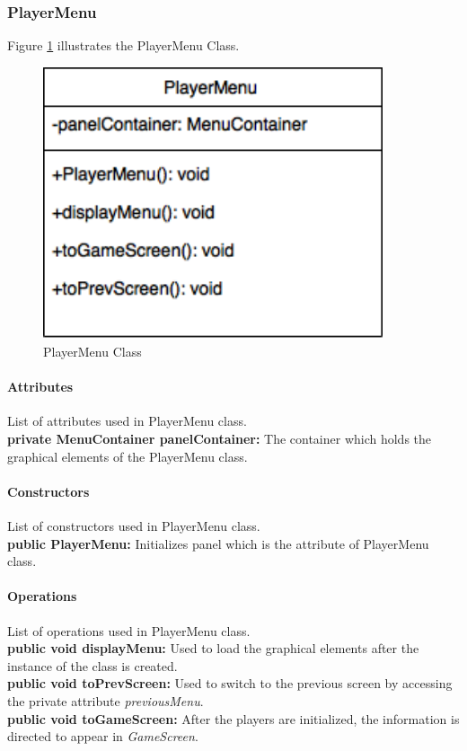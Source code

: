 \documentclass[12pt]{article} %
\begin{document}

\subsubsection{PlayerMenu} %

Figure \ref{fig:playermenu} illustrates the PlayerMenu Class.
\begin{figure}[h!]
   \centering
   \vspace{10pt}%
   \includegraphics[width=10cm]{playermenu.png}
   \caption{PlayerMenu Class}
   \label{fig:playermenu}
\end{figure}

\paragraph{Attributes \\}

List of attributes used in PlayerMenu class.\\
\textbf{private MenuContainer panelContainer:} The container which holds the graphical elements of the PlayerMenu class. 

\paragraph{Constructors \\}
List of constructors used in PlayerMenu class.\\
\textbf{public PlayerMenu:} Initializes panel which is the attribute of PlayerMenu class.


\paragraph{Operations \\}
List of operations used in PlayerMenu class.\\
\textbf{public void displayMenu:} Used to load the graphical elements after the instance of the class is created.\\
\textbf{public void toPrevScreen:} Used to switch to the previous screen by accessing the private attribute \textit{previousMenu}.\\
\textbf{public void toGameScreen:} After the players are initialized, the information is directed to appear in \textit{GameScreen}.
\end{document}
